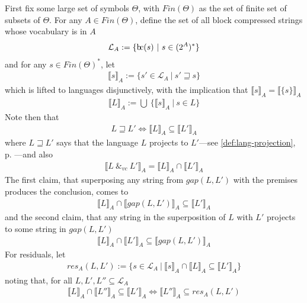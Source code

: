 \documentclass[a4paper,12pt,leqno,twoside]{article}
\newcommand{\bc}{{\rm b\!c}}
\newcommand{\spvc}{~\&_{v\!c}~}
\begin{document}
First fix some large set of symbols $\Theta$, with $Fin(\Theta)$ as the set of finite set of subsets of $\Theta$. For any $A \in Fin(\Theta)$, define the set of all block compressed strings whose vocabulary is in $A$
\begin{align}
	\mathcal{L}_A := \{ \bc(s) ~|~ s \in (2^A)^* \}
\end{align}
and for any $s \in Fin(\Theta)^*$, let
\begin{align}
	\llbracket s \rrbracket_A := \{s' \in \mathcal{L}_A ~|~ s' \sqsupseteq s\}
\end{align}
which is lifted to languages disjunctively, with the implication that $\llbracket s \rrbracket_A = \llbracket \{s\} \rrbracket_A$
\begin{align}
	\llbracket L \rrbracket_A := \bigcup ~ \{\llbracket s \rrbracket_A ~|~ s \in L \}
\end{align}
Note then that
\begin{align}
	L \sqsupseteq L' \Longleftrightarrow \llbracket L \rrbracket_A \subseteq \llbracket L' \rrbracket_A
\end{align}
where $L \sqsupseteq L'$ says that the language $L$ projects to $L'$---see \cref{def:lang-projection}, p. \pageref{def:lang-projection}---and also
\begin{align}
	\llbracket L \spvc L' \rrbracket_A = \llbracket L \rrbracket_A \cap \llbracket L' \rrbracket_A
\end{align}
The first claim, that superposing any string from $gap(L,L')$ with the premises produces the conclusion, comes to
\begin{align}
	\llbracket L \rrbracket_A \cap \llbracket gap(L, L') \rrbracket_A \subseteq \llbracket L' \rrbracket_A
\end{align}
and the second claim, that any string in the superposition of $L$ with $L'$ projects to some string in $gap(L, L')$
\begin{align}
	\llbracket L \rrbracket_A \cap \llbracket L' \rrbracket_A \subseteq \llbracket gap(L, L') \rrbracket_A
\end{align}
For residuals, let
\begin{align}
	res_A(L, L') := \{s \in \mathcal{L}_A ~|~ \llbracket s \rrbracket_A \cap \llbracket L \rrbracket_A \subseteq \llbracket L' \rrbracket_A \}
\end{align}
noting that, for all $L, L', L'' \subseteq \mathcal{L}_A$
\begin{align}
	\llbracket L \rrbracket_A \cap \llbracket L'' \rrbracket_A \subseteq \llbracket L' \rrbracket_A \Longleftrightarrow \llbracket L'' \rrbracket_A \subseteq res_A(L, L')
\end{align}
\end{document}
